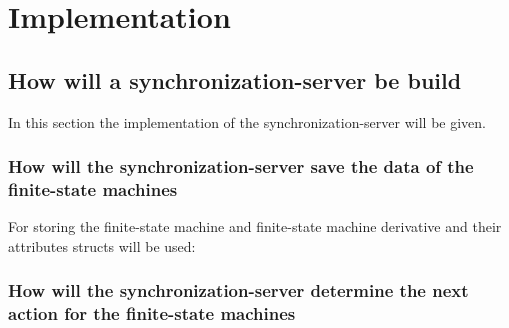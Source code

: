 \hypertarget{implementation}{%
\chapter{Implementation}\label{implementation}}

\hypertarget{how-will-a-synchronization-server-be-build}{%
\section{How will a synchronization-server be
build}\label{how-will-a-synchronization-server-be-build}}

In this section the implementation of the synchronization-server will be
given.

\hypertarget{how-will-the-synchronization-server-save-the-data-of-the-finite-state-machines}{%
\subsection{How will the synchronization-server save the data of the
finite-state
machines}\label{how-will-the-synchronization-server-save-the-data-of-the-finite-state-machines}}

For storing the finite-state machine and finite-state machine derivative
and their attributes structs will be used:

\begin{Shaded}
\begin{Highlighting}[]
 
\NormalTok{\{}

 
\NormalTok{\{}
\end{Highlighting}
\end{Shaded}

\hypertarget{how-will-the-synchronization-server-determine-the-next-action-for-the-finite-state-machines}{%
\subsection{How will the synchronization-server determine the next
action for the finite-state
machines}\label{how-will-the-synchronization-server-determine-the-next-action-for-the-finite-state-machines}}

